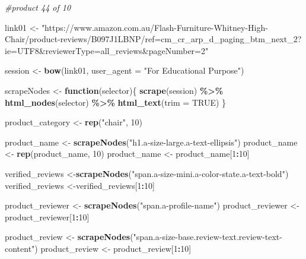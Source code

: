 \documentclass[
]{article}
\newenvironment{Shaded}{\begin{snugshade}}{\end{snugshade}}
\newcommand{\AttributeTok}[1]{\textcolor[rgb]{0.13,0.29,0.53}{#1}}
\newcommand{\CommentTok}[1]{\textcolor[rgb]{0.56,0.35,0.01}{\textit{#1}}}
\newcommand{\ConstantTok}[1]{\textcolor[rgb]{0.56,0.35,0.01}{#1}}
\newcommand{\ControlFlowTok}[1]{\textcolor[rgb]{0.13,0.29,0.53}{\textbf{#1}}}
\newcommand{\DecValTok}[1]{\textcolor[rgb]{0.00,0.00,0.81}{#1}}
\newcommand{\FunctionTok}[1]{\textcolor[rgb]{0.13,0.29,0.53}{\textbf{#1}}}
\newcommand{\NormalTok}[1]{#1}
\newcommand{\OtherTok}[1]{\textcolor[rgb]{0.56,0.35,0.01}{#1}}
\newcommand{\SpecialCharTok}[1]{\textcolor[rgb]{0.81,0.36,0.00}{\textbf{#1}}}
\newcommand{\StringTok}[1]{\textcolor[rgb]{0.31,0.60,0.02}{#1}}
\begin{document}
\begin{Shaded}
\begin{Highlighting}[]
\CommentTok{\#product 44 of 10}

\NormalTok{link01 }\OtherTok{\textless{}{-}} \StringTok{"https://www.amazon.com.au/Flash{-}Furniture{-}Whitney{-}High{-}Chair/product{-}reviews/B097J1LBNP/ref=cm\_cr\_arp\_d\_paging\_btm\_next\_2?ie=UTF8\&reviewerType=all\_reviews\&pageNumber=2"}


\NormalTok{  session }\OtherTok{\textless{}{-}} \FunctionTok{bow}\NormalTok{(link01,}
               \AttributeTok{user\_agent =} \StringTok{"For Educational Purpose"}\NormalTok{)}

\NormalTok{  scrapeNodes }\OtherTok{\textless{}{-}} \ControlFlowTok{function}\NormalTok{(selector)\{}
    \FunctionTok{scrape}\NormalTok{(session) }\SpecialCharTok{\%\textgreater{}\%}
      \FunctionTok{html\_nodes}\NormalTok{(selector) }\SpecialCharTok{\%\textgreater{}\%}
      \FunctionTok{html\_text}\NormalTok{(}\AttributeTok{trim =} \ConstantTok{TRUE}\NormalTok{)}
\NormalTok{  \}}

\NormalTok{  product\_category }\OtherTok{\textless{}{-}} \FunctionTok{rep}\NormalTok{(}\StringTok{"chair"}\NormalTok{, }\DecValTok{10}\NormalTok{)}

\NormalTok{  product\_name }\OtherTok{\textless{}{-}} \FunctionTok{scrapeNodes}\NormalTok{(}\StringTok{"h1.a{-}size{-}large.a{-}text{-}ellipsis"}\NormalTok{)}
\NormalTok{  product\_name }\OtherTok{\textless{}{-}} \FunctionTok{rep}\NormalTok{(product\_name, }\DecValTok{10}\NormalTok{)}
\NormalTok{  product\_name }\OtherTok{\textless{}{-}}\NormalTok{ product\_name[}\DecValTok{1}\SpecialCharTok{:}\DecValTok{10}\NormalTok{]}
  
\NormalTok{  verified\_reviews }\OtherTok{\textless{}{-}}\FunctionTok{scrapeNodes}\NormalTok{(}\StringTok{"span.a{-}size{-}mini.a{-}color{-}state.a{-}text{-}bold"}\NormalTok{)}
\NormalTok{  verified\_reviews }\OtherTok{\textless{}{-}}\NormalTok{verified\_reviews[}\DecValTok{1}\SpecialCharTok{:}\DecValTok{10}\NormalTok{]}
  
\NormalTok{  product\_reviewer }\OtherTok{\textless{}{-}} \FunctionTok{scrapeNodes}\NormalTok{(}\StringTok{"span.a{-}profile{-}name"}\NormalTok{)}
\NormalTok{  product\_reviewer }\OtherTok{\textless{}{-}}\NormalTok{ product\_reviewer[}\DecValTok{1}\SpecialCharTok{:}\DecValTok{10}\NormalTok{]}
  
\NormalTok{  product\_review }\OtherTok{\textless{}{-}} \FunctionTok{scrapeNodes}\NormalTok{(}\StringTok{"span.a{-}size{-}base.review{-}text.review{-}text{-}content"}\NormalTok{)}
\NormalTok{  product\_review }\OtherTok{\textless{}{-}}\NormalTok{ product\_review[}\DecValTok{1}\SpecialCharTok{:}\DecValTok{10}\NormalTok{]}
  

\end{Highlighting}
\end{Shaded}
\end{document}

